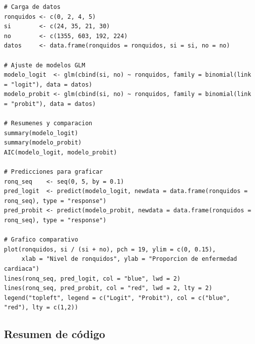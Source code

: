 \begin{lstlisting}[caption={Modelos Logit y Probit para Enfermedad Cardiaca}, label={lst:glm_r}]
# Carga de datos
ronquidos <- c(0, 2, 4, 5)
si        <- c(24, 35, 21, 30)
no        <- c(1355, 603, 192, 224)
datos     <- data.frame(ronquidos = ronquidos, si = si, no = no)

# Ajuste de modelos GLM
modelo_logit  <- glm(cbind(si, no) ~ ronquidos, family = binomial(link = "logit"), data = datos)
modelo_probit <- glm(cbind(si, no) ~ ronquidos, family = binomial(link = "probit"), data = datos)

# Resumenes y comparacion
summary(modelo_logit)
summary(modelo_probit)
AIC(modelo_logit, modelo_probit)

# Predicciones para graficar
ronq_seq    <- seq(0, 5, by = 0.1)
pred_logit  <- predict(modelo_logit, newdata = data.frame(ronquidos = ronq_seq), type = "response")
pred_probit <- predict(modelo_probit, newdata = data.frame(ronquidos = ronq_seq), type = "response")

# Grafico comparativo
plot(ronquidos, si / (si + no), pch = 19, ylim = c(0, 0.15),
     xlab = "Nivel de ronquidos", ylab = "Proporcion de enfermedad cardiaca")
lines(ronq_seq, pred_logit, col = "blue", lwd = 2)
lines(ronq_seq, pred_probit, col = "red", lwd = 2, lty = 2)
legend("topleft", legend = c("Logit", "Probit"), col = c("blue", "red"), lty = c(1,2))
\end{lstlisting}

\subsection{Resumen de código}

